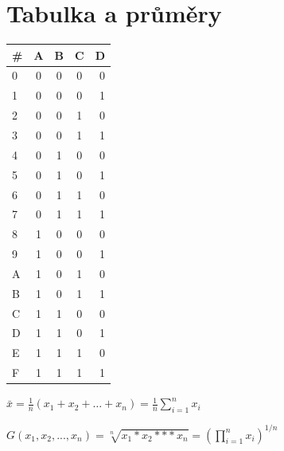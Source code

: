 \documentclass[a4paper,12pt]{report}
\begin{document}
\chapter{Tabulka a průměry}

\begin{tabular}{|l|c|c|c|r|}
\hline
\# & A & B & C & D \\
\hline
0 & 0 & 0 & 0 & 0 \\
\hline
1 & 0 & 0 & 0 & 1 \\
\hline
2 & 0 & 0 & 1 & 0 \\
\hline
3 & 0 & 0 & 1 & 1 \\
\hline
4 & 0 & 1 & 0 & 0 \\
\hline
5 & 0 & 1 & 0 & 1 \\
\hline
6 & 0 & 1 & 1 & 0 \\
\hline
7 & 0 & 1 & 1 & 1 \\
\hline
8 & 1 & 0 & 0 & 0 \\
\hline
9 & 1 & 0 & 0 & 1 \\
\hline
A & 1 & 0 & 1 & 0 \\
\hline
B & 1 & 0 & 1 & 1 \\
\hline
C & 1 & 1 & 0 & 0 \\
\hline
D & 1 & 1 & 0 & 1 \\
\hline
E & 1 & 1 & 1 & 0 \\
\hline
F & 1 & 1 & 1 & 1 \\
\hline
\end{tabular}


${\bar {x}}={\frac {1}{n}}\left(x_{1}+x_{2}+\ldots +x_{n}\right)={\frac {1}{n}}\sum _{{i=1}}^{{n}}x_{i}$

$G(x_1,x_2,...,x_n) = \sqrt[n]{x_1*x_2***x_n} = (\prod_{i=1}^{n} x_i)^{1/n}$
\end{document}

